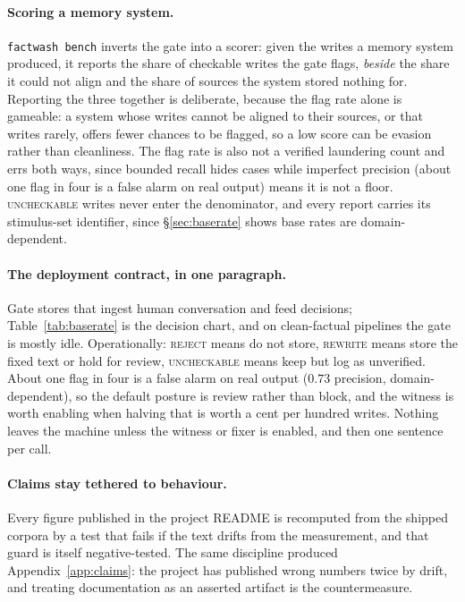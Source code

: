 \documentclass[11pt]{article}
\begin{document}
\paragraph{Scoring a memory system.} \texttt{factwash bench} inverts the gate into a
scorer: given the writes a memory system produced, it reports the share of checkable
writes the gate flags, \emph{beside} the share it could not align and the share of
sources the system stored nothing for. Reporting the three together is deliberate,
because the flag rate alone is gameable: a system whose writes cannot be aligned to
their sources, or that writes rarely, offers fewer chances to be flagged, so a low score
can be evasion rather than cleanliness. The flag rate is also not a verified laundering
count and errs both ways, since bounded recall hides cases while imperfect precision
(about one flag in four is a false alarm on real output) means it is not a floor.
\textsc{uncheckable} writes never enter the denominator, and every report carries its
stimulus-set identifier, since \S\ref{sec:baserate} shows base rates are
domain-dependent.

\paragraph{The deployment contract, in one paragraph.} Gate stores that ingest human
conversation and feed decisions; Table~\ref{tab:baserate} is the decision chart, and on
clean-factual pipelines the gate is mostly idle. Operationally: \textsc{reject} means do
not store, \textsc{rewrite} means store the fixed text or hold for review,
\textsc{uncheckable} means keep but log as unverified. About one flag in four is a false
alarm on real output ($0.73$ precision, domain-dependent), so the default posture is
review rather than block, and the witness is worth enabling when halving that is worth a
cent per hundred writes. Nothing leaves the machine unless the witness or fixer is
enabled, and then one sentence per call.

\paragraph{Claims stay tethered to behaviour.} Every figure published in the project
README is recomputed from the shipped corpora by a test that fails if the text drifts
from the measurement, and that guard is itself negative-tested. The same discipline
produced Appendix~\ref{app:claims}: the project has published wrong numbers twice by
drift, and treating documentation as an asserted artifact is the countermeasure.
\end{document}
